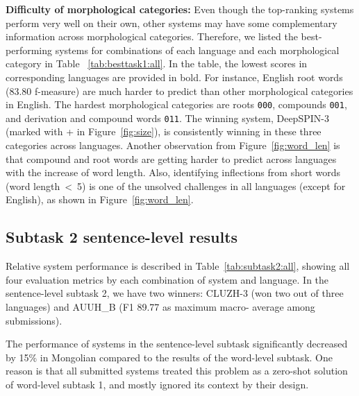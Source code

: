 \documentclass[11pt]{article}
\begin{document}
\vspace{1em} \noindent \textbf{Difficulty of morphological categories:} Even though the top-ranking systems perform very well on their own, other systems may have some complementary information across morphological categories. Therefore, we listed the best-performing systems for combinations of each language and each morphological category in Table~ \ref{tab:besttask1:all}. In the table, the lowest scores in corresponding languages are provided in bold. For instance, English root words (83.80 f-measure) are much harder to predict than other morphological categories in English. The hardest morphological categories are roots \texttt{000}, compounds \texttt{001}, and derivation and compound words \texttt{011}. The winning system, DeepSPIN-3 (marked with + in Figure~\ref{fig:size}), is consistently winning in these three categories across languages. Another observation from Figure~\ref{fig:word_len} is that compound and root words are getting harder to predict across languages with the increase of word length. Also, identifying inflections from short words (word length~\textless~5) is one of the unsolved challenges in all languages (except for English), as shown in Figure~\ref{fig:word_len}. 

\subsection{Subtask 2 sentence-level results}
Relative system performance is described in Table~\ref{tab:subtask2:all}, showing all four evaluation metrics by each combination of system and language. In the sentence-level subtask 2, we have two winners: CLUZH-3 (won two out of three languages) and AUUH\_B (F1 89.77 as maximum macro- average among submissions).

The performance of systems in the sentence-level subtask significantly decreased by 15\% in Mongolian compared to the results of the word-level subtask. One reason is that all submitted systems treated this problem as a zero-shot solution of word-level subtask 1, and mostly ignored its context by their design. 
\end{document}
